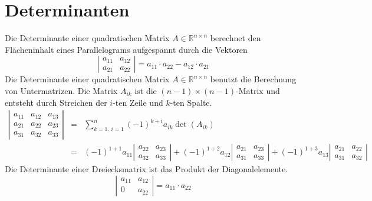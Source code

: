 \section{Determinanten}
Die Determinante einer quadratischen Matrix $A\in \mathbb{R}^{n\times n}$ berechnet den Flächeninhalt eines Parallelograms aufgespannt durch die Vektoren
\begin{equation}
\boxed{\left\vert\begin{matrix}a_{11}&a_{12}\\a_{21}&a_{22}\end{matrix}\right\vert=a_{11}\cdot a_{22}-a_{12}\cdot a_{21}}
\end{equation}
Die Determinante einer quadratischen Matrix $A\in \mathbb{R}^{n\times n}$ benutzt die Berechnung von Untermatrizen. Die Matrix $A_{ik}$ ist die $\left(n-1\right)\times\left(n-1\right)$-Matrix und entsteht durch Streichen der $i$-ten Zeile und $k$-ten Spalte.
\begin{equation}
\boxed{\begin{array}{lll}
\left\vert\begin{matrix}a_{11}&a_{12}&a_{13}\\a_{21}&a_{22}&a_{23}\\a_{31}&a_{32}&a_{33}\end{matrix}\right\vert&=&\displaystyle \sum_{k=1,\,i=1}^n\left(-1\right)^{k+i}a_{ik}\det\left(A_{ik}\right)\\
&=&\left(-1\right)^{1+1}a_{11}\left\vert\begin{matrix}a_{22}&a_{23}\\a_{32}&a_{33}\end{matrix}\right\vert+\left(-1\right)^{1+2}a_{12}\left\vert\begin{matrix}a_{21}&a_{23}\\a_{31}&a_{33}\end{matrix}\right\vert+\left(-1\right)^{1+3}a_{13}\left\vert\begin{matrix}a_{21}&a_{22}\\a_{31}&a_{32}\end{matrix}\right\vert
\end{array}}
\end{equation}
Die Determinante einer Dreiecksmatrix ist das Produkt der Diagonalelemente.
\begin{equation}
\boxed{\left\vert\begin{matrix}a_{11}&a_{12}\\0&a_{22}\end{matrix}\right\vert=a_{11}\cdot a_{22}}
\end{equation}
